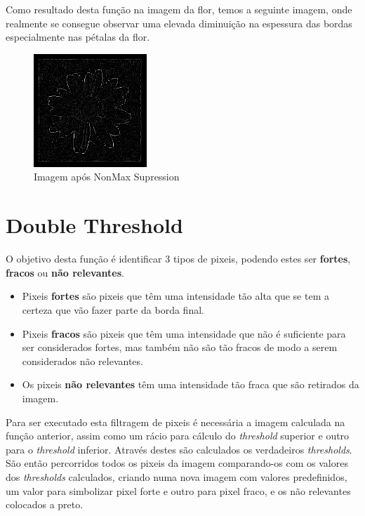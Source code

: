 \documentclass[a4paper]{report}
\begin{document}
Como resultado desta função na imagem da flor, temos a seguinte imagem, onde realmente se consegue
observar uma elevada diminuição na espessura das bordas especialmente nas pétalas da flor.

\begin{figure}[H]
    \centering
        \includegraphics[width=0.38\textwidth]{images/Canny/flowerNonMax.png}
        \caption{Imagem após NonMax Supression}
\end{figure}


\section{Double Threshold}
O objetivo desta função é identificar 3 tipos de pixeis, podendo estes ser \textbf{fortes},
\textbf{fracos} ou \textbf{não relevantes}.

\begin{itemize}
    \item Pixeis \textbf{fortes} são pixeis que têm uma intensidade tão alta que se tem a certeza que vão fazer parte da borda final.
    \item Pixeis \textbf{fracos} são pixeis que têm uma intensidade que não é suficiente para ser considerados fortes, mas também não são tão fracos de modo a serem considerados não relevantes.
    \item Os pixeis \textbf{não relevantes} têm uma intensidade tão fraca que são retirados da imagem.
\end{itemize}

Para ser executado esta filtragem de pixeis é necessária a imagem calculada na função anterior, assim
como um rácio para cálculo do \textit{threshold} superior e outro para o \textit{threshold}
inferior. Através destes são calculados os verdadeiros \textit{thresholds}. São então percorridos
todos os pixeis da imagem comparando-os com os valores dos \textit{thresholds} calculados, criando
numa nova imagem com valores predefinidos, um valor para simbolizar pixel forte e outro para pixel
fraco, e os não relevantes colocados a preto. 
\end{document}
